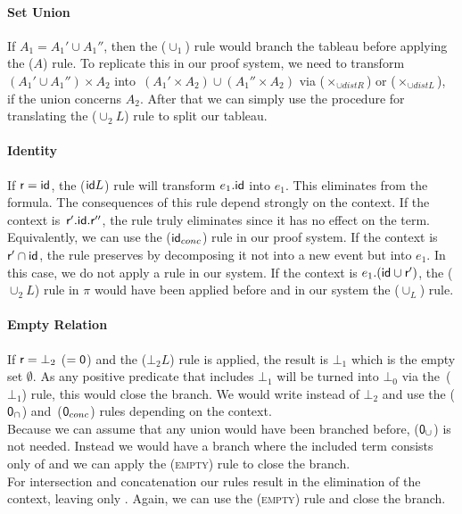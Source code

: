 \documentclass[a4paper,twoside,12pt, english]{article}
\begin{document}
\paragraph{Set Union} If $A_1 = A_1' \cup A_1''$, then the ($\cup_1$) rule would branch the tableau before applying the ($A$) rule.
To replicate this in our proof system, we need to transform $(A_1' \cup A_1'') \times A_2$ into~$(A_1' \times A_2) \cup (A_1'' \times A_2)$ via ($\times_{\cup distR}$) or ($\times_{\cup distL}$), if the union concerns $A_2$. After that we can simply use the procedure for translating the ($\cup_2L$) rule to split our tableau. 

\paragraph{Identity} If $\textsf{\upshape r} = \textsf{\upshape id}$, the ($\textsf{\upshape id} L$) rule will transform $e_1.\textsf{\upshape id}$ into $e_1$. This eliminates \id{} from the formula. The consequences of this rule depend strongly on the context. If the context is~$\textsf{\upshape r}'.\textsf{\upshape id}.\textsf{\upshape r}''$, the rule truly eliminates \id{} since it has no effect on the term. Equivalently, we can use the ($\textsf{\upshape id}_{conc}$) rule in our proof system.
If the context is~$\textsf{\upshape r}' \cap \textsf{\upshape id}$, the rule preserves \id{} by decomposing it not into a new event but into $e_1$. In this case, we do not apply a rule in our system.
If the context is $e_1.(\textsf{\upshape id} \cup \textsf{\upshape r}')$, the ($\cup_2L$) rule in $\pi$ would have been applied before and in our system the ($\cup_L$) rule. 

\paragraph{Empty Relation} If $\textsf{\upshape r} = \bot_2$ ($= \textsf{\upshape 0}$) and the ($\bot_2L$) rule is applied, the result is $\bot_1$ which is the empty set $\emptyset$. As any positive predicate that includes $\bot_1$ will be turned into $\bot_0$ via the~($\bot_1$) rule, this would close the branch. 
We would write \0{} instead of $\bot_2$ and use the ($\textsf{\upshape 0}_\cap$) and~($\textsf{\upshape 0}_{conc}$) rules depending on the context. \\ \newpage
Because we can assume that any union would have been branched before, ($\textsf{\upshape 0}_\cup$) is not needed. Instead we would have a branch where the included term consists only of \0{} and we can apply the (\textsc{empty}) rule to close the branch. \\
For intersection and concatenation our rules result in the elimination of the context, leaving only \0. Again, we can use the (\textsc{empty}) rule and close the branch. 
\end{document}
